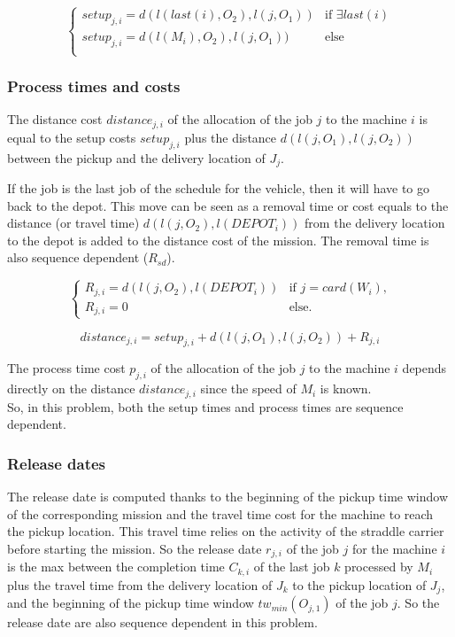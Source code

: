 \documentclass[a4paper,10pt]{article}
\begin{document}
\begin{equation*}
 \begin{cases}
  setup_{j, i} = d(l(last(i),O_2),l(j,O_1)) & \text{if $\exists last(i)$}\\
  setup_{j, i} = d(l(M_i),O_2),l(j,O_1)) & \text{else}\\
 \end{cases}
\end{equation*}

\subsubsection{Process times and costs}

The distance cost $distance_{j, i}$ of the allocation of the job $j$ to the machine $i$ is equal to the setup costs $setup_{j, i}$ plus the distance $d(l(j,O_1), l(j,O_2))$ between the pickup and the delivery location of $J_j$.

If the job is the last job of the schedule for the vehicle, then it will have to go back to the depot. This move can be seen as a removal time or cost equals to the distance (or travel time) $d(l(j,O_2),l(DEPOT_{i}))$ from the delivery location to the depot is added to the distance cost of the mission. The removal time is also sequence dependent ($R_{sd}$).

\begin{equation*}
\begin{cases}
 R_{j, i} = d(l(j,O_2),l(DEPOT_{i})) & \text{if $j = card(W_{i})$,} \\
 R_{j, i} = 0 & \text{else.}
\end{cases}
\end{equation*}

\begin{equation*}
  distance_{j,i} = setup_{j, i} + d(l(j,O_1), l(j,O_2)) + R_{j,i}
\end{equation*}

The process time cost $p_{j, i}$ of the allocation of the job $j$ to the machine $i$ depends directly on the distance $distance_{j,i}$ since the speed of $M_i$ is known.\\

So, in this problem, both the setup times and process times are sequence dependent.


\subsubsection{Release dates}
The release date is computed thanks to the beginning of the pickup time window of the corresponding mission and the travel time cost for the machine to reach the pickup location. This travel time relies on the activity of the straddle carrier before starting the mission. So the release date $r_{j,i}$ of the job $j$ for the machine $i$ is the max between the completion time $C_{k,i}$ of the last job $k$  processed by $M_i$ plus the travel time from the delivery location of $J_k$ to the pickup location of $J_j$, and the beginning of the pickup time window $tw_{min}(O_{j,1})$ of the job $j$. So the release date are also sequence dependent in this problem.
\end{document}
